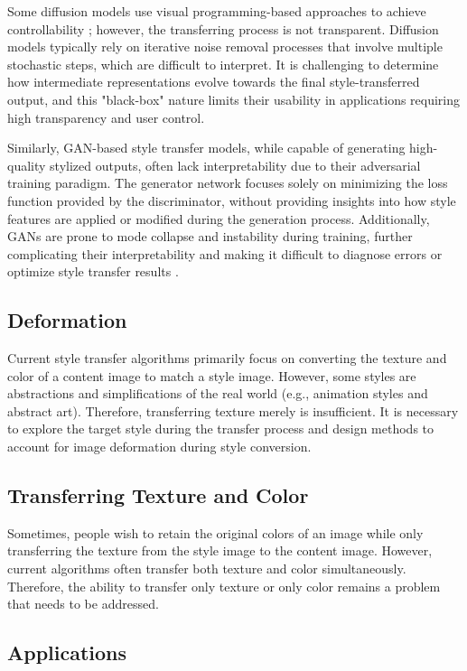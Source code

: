 \documentclass[preprint,12pt]{elsarticle}
\begin{document}
Some diffusion models use visual programming-based approaches to achieve controllability \citep{124gupta2023visual, 125han2024image}; however, the transferring process is not transparent. Diffusion models typically rely on iterative noise removal processes that involve multiple stochastic steps, which are difficult to interpret. It is challenging to determine how intermediate representations evolve towards the final style-transferred output, and this "black-box" nature limits their usability in applications requiring high transparency and user control.

Similarly, GAN-based style transfer models, while capable of generating high-quality stylized outputs, often lack interpretability due to their adversarial training paradigm. The generator network focuses solely on minimizing the loss function provided by the discriminator, without providing insights into how style features are applied or modified during the generation process. Additionally, GANs are prone to mode collapse and instability during training, further complicating their interpretability and making it difficult to diagnose errors or optimize style transfer results \citep{37zhu2017unpaired, 19karras2019style}.
\subsection{Deformation}

Current style transfer algorithms primarily focus on converting the texture and color of a content image to match a style image. However, some styles are abstractions and simplifications of the real world (e.g., animation styles and abstract art). Therefore, transferring texture merely is insufficient. It is necessary to explore the target style during the transfer process and design methods to account for image deformation during style conversion.

\subsection{Transferring Texture and Color}

Sometimes, people wish to retain the original colors of an image while only transferring the texture from the style image to the content image. However, current algorithms often transfer both texture and color simultaneously. Therefore, the ability to transfer only texture or only color remains a problem that needs to be addressed.


\subsection{Applications}
\end{document}
